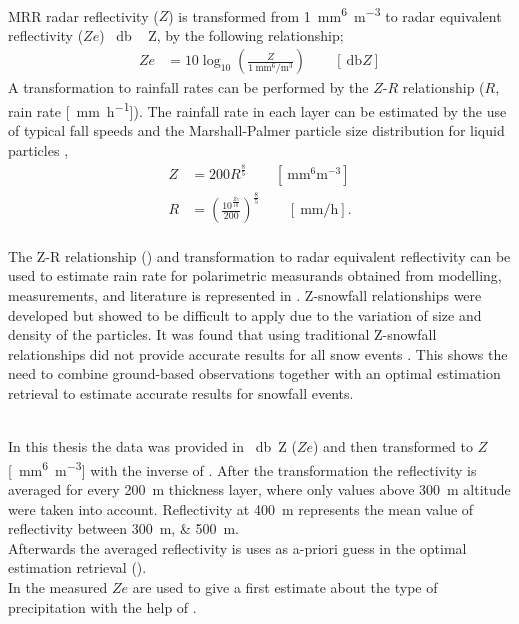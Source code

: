 \\
MRR radar reflectivity ($Z$) is transformed from \SI{1}{\mm^6\per\metre^3} to radar equivalent reflectivity ($Ze$) \SI{}{\decibel\,Z}, by the following relationship;
\begin{align}
	Ze & = 10 \log_{10} \left(\frac{Z}{\SI{1}{\mm^6\per\metre^3}}\right) \qquad [\SI{}{\decibel Z}]
	\label{eq:Ze}
\end{align}
\newpage
\noindent
A transformation to rainfall rates can be performed by the $Z$-$R$ relationship ($R$, rain rate [\SI{}{\mm\per\hour}]). 
The rainfall rate in each layer can be estimated by the use of typical fall speeds and the Marshall-Palmer particle size distribution for liquid particles \citep{rinehart_radar_2010},  
\begin{align}
	Z & = 200 R^{\frac{8}{5}} \qquad [\SI{}{\mm^6\metre^{-3}} ] \nonumber \\ 
	R & = \left( \frac{ 10^{\frac{Ze}{10}} }{200} \right)^{\frac{8}{5}} \qquad [ \SI{}{\mm\per\hour} ].
	\label{eq:Z-R}
\end{align}
\\
The Z-R relationship () and transformation to radar equivalent reflectivity can be used to estimate rain rate for polarimetric measurands obtained from modelling, measurements, and literature \citep{doviak_doppler_1993} is represented in . Z-snowfall relationships were developed but showed to be difficult to apply due to the variation of size and density of the particles. It was found that using traditional Z-snowfall relationships did not provide accurate results for all snow events \citep{lecuyer_aos_2017}. 
This shows the need to combine ground-based observations together with an optimal estimation retrieval to estimate accurate results for snowfall events.

\noindent
\\
In this thesis the data was provided in \SI{}{\decibel Z} ($Ze$) and then transformed to $Z$ [\SI{}{\mm^6\metre^{-3}}] with the inverse of . After the transformation the reflectivity is averaged for every \SI{200}{\metre} thickness layer, where only values above \SI{300}{\metre} altitude were taken into account. Reflectivity at \SI{400}{\metre} represents the mean value of reflectivity between \SIlist{300;500}{\metre}. 
\\
Afterwards the averaged reflectivity is uses as a-priori guess in the optimal estimation retrieval ().
\\
In  the measured $Ze$ are used to give a first estimate about the type of precipitation with the help of .


